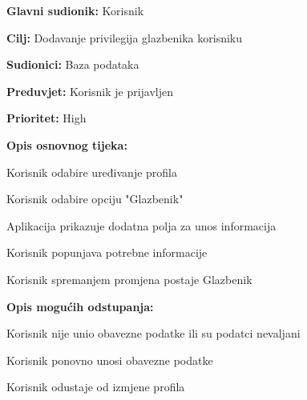 \noindent {}
	\begin{packed_item}
		
		\item \textbf{Glavni sudionik: } Korisnik
		\item \textbf{Cilj:} Dodavanje privilegija glazbenika korisniku
		\item \textbf{Sudionici:} Baza podataka
		\item \textbf{Preduvjet:} Korisnik je prijavljen
		\item \textbf{Prioritet:} High
		\item \textbf{Opis osnovnog tijeka:} 
		
		\item[] \begin{packed_enum}
			
			\item Korisnik odabire uređivanje profila
			\item Korisnik odabire opciju "Glazbenik"
			\item Aplikacija prikazuje dodatna polja za unos informacija
			\item Korisnik popunjava potrebne informacije
			\item Korisnik spremanjem promjena postaje Glazbenik
	
		\end{packed_enum}
		\item  \textbf{Opis mogućih odstupanja:}
	
		\item[] \begin{packed_item}
			
			\item[4.a] Korisnik nije unio obavezne podatke ili su podatci nevaljani
			\item[] \begin{packed_enum}
				
				\item Korisnik ponovno unosi obavezne podatke
				\item Korisnik odustaje od izmjene profila
				
			\end{packed_enum}
		\end{packed_item}
	\end{packed_item}	
		
